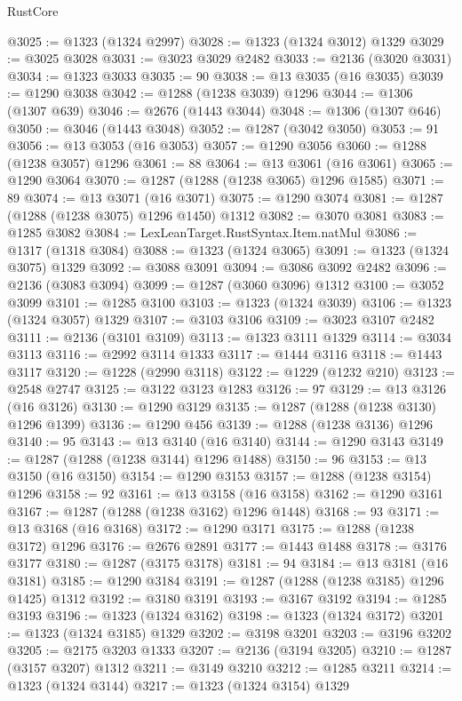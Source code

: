 \begin{lexlean}{RustCore}
\begin{coremodule}
@3025 := @1323 (@1324 @2997)
@3028 := @1323 (@1324 @3012) @1329
@3029 := @3025 @3028
@3031 := @3023 @3029 @2482
@3033 := @2136 (@3020 @3031)
@3034 := @1323 @3033
@3035 := 90
@3038 := @13 @3035 (@16 @3035)
@3039 := @1290 @3038
@3042 := @1288 (@1238 @3039) @1296
@3044 := @1306 (@1307 @639)
@3046 := @2676 (@1443 @3044)
@3048 := @1306 (@1307 @646)
@3050 := @3046 (@1443 @3048)
@3052 := @1287 (@3042 @3050)
@3053 := 91
@3056 := @13 @3053 (@16 @3053)
@3057 := @1290 @3056
@3060 := @1288 (@1238 @3057) @1296
@3061 := 88
@3064 := @13 @3061 (@16 @3061)
@3065 := @1290 @3064
@3070 := @1287 (@1288 (@1238 @3065) @1296 @1585)
@3071 := 89
@3074 := @13 @3071 (@16 @3071)
@3075 := @1290 @3074
@3081 := @1287 (@1288 (@1238 @3075) @1296 @1450) @1312
@3082 := @3070 @3081
@3083 := @1285 @3082
@3084 := LexLeanTarget.RustSyntax.Item.natMul
@3086 := @1317 (@1318 @3084)
@3088 := @1323 (@1324 @3065)
@3091 := @1323 (@1324 @3075) @1329
@3092 := @3088 @3091
@3094 := @3086 @3092 @2482
@3096 := @2136 (@3083 @3094)
@3099 := @1287 (@3060 @3096) @1312
@3100 := @3052 @3099
@3101 := @1285 @3100
@3103 := @1323 (@1324 @3039)
@3106 := @1323 (@1324 @3057) @1329
@3107 := @3103 @3106
@3109 := @3023 @3107 @2482
@3111 := @2136 (@3101 @3109)
@3113 := @1323 @3111 @1329
@3114 := @3034 @3113
@3116 := @2992 @3114 @1333
@3117 := @1444 @3116
@3118 := @1443 @3117
@3120 := @1228 (@2990 @3118)
@3122 := @1229 (@1232 @210)
@3123 := @2548 @2747
@3125 := @3122 @3123 @1283
@3126 := 97
@3129 := @13 @3126 (@16 @3126)
@3130 := @1290 @3129
@3135 := @1287 (@1288 (@1238 @3130) @1296 @1399)
@3136 := @1290 @456
@3139 := @1288 (@1238 @3136) @1296
@3140 := 95
@3143 := @13 @3140 (@16 @3140)
@3144 := @1290 @3143
@3149 := @1287 (@1288 (@1238 @3144) @1296 @1488)
@3150 := 96
@3153 := @13 @3150 (@16 @3150)
@3154 := @1290 @3153
@3157 := @1288 (@1238 @3154) @1296
@3158 := 92
@3161 := @13 @3158 (@16 @3158)
@3162 := @1290 @3161
@3167 := @1287 (@1288 (@1238 @3162) @1296 @1448)
@3168 := 93
@3171 := @13 @3168 (@16 @3168)
@3172 := @1290 @3171
@3175 := @1288 (@1238 @3172) @1296
@3176 := @2676 @2891
@3177 := @1443 @1488
@3178 := @3176 @3177
@3180 := @1287 (@3175 @3178)
@3181 := 94
@3184 := @13 @3181 (@16 @3181)
@3185 := @1290 @3184
@3191 := @1287 (@1288 (@1238 @3185) @1296 @1425) @1312
@3192 := @3180 @3191
@3193 := @3167 @3192
@3194 := @1285 @3193
@3196 := @1323 (@1324 @3162)
@3198 := @1323 (@1324 @3172)
@3201 := @1323 (@1324 @3185) @1329
@3202 := @3198 @3201
@3203 := @3196 @3202
@3205 := @2175 @3203 @1333
@3207 := @2136 (@3194 @3205)
@3210 := @1287 (@3157 @3207) @1312
@3211 := @3149 @3210
@3212 := @1285 @3211
@3214 := @1323 (@1324 @3144)
@3217 := @1323 (@1324 @3154) @1329

\end{coremodule}
\end{lexlean}
